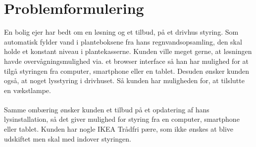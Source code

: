 \section{Problemformulering}

En bolig ejer har bedt om en løsning og et tilbud, på et drivhus styring. 
Som automatisk fylder vand i planteboksene fra hans regnvandsopsamling, den skal holde et konstant niveau i plantekasserne. 
Kunden ville meget gerne, at løsningen havde overvågningsmulighed via. et browser interface så han har mulighed for at tilgå styringen fra 
computer, smartphone eller en tablet.
Desuden ønsker kunden også, at noget lysstyring i drivhuset. Så kunden har muligheden for, at tilslutte en vækstlampe.
\\
\\
Samme ombæring ønsker kunden et tilbud på et opdatering af hans lysinstallation, så det giver mulighed for styring fra en computer, smartphone eller tablet.
Kunden har nogle IKEA Trådfri pære, som ikke ønskes at blive udskiftet men skal med indover styringen.